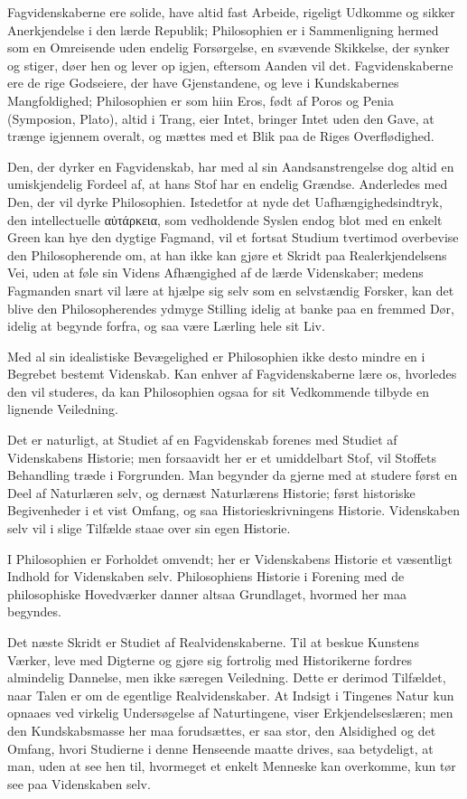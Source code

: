 \documentclass[12pt]{book}
\newcommand{\opage}[1]{\marginnote{\footnotesize\textit{[#1]}}}
\begin{document}
Fagvidenskaberne ere solide, have altid fast Arbeide, rigeligt Udkomme og sikker
Anerkjendelse i den lærde Republik; Philosophien er i Sammenligning hermed som en
Omreisende uden endelig Forsørgelse, en svævende Skikkelse, der synker og stiger, døer hen
og lever op igjen, eftersom Aanden vil det. Fagvidenskaberne ere de rige Godseiere, der
have Gjenstandene, og leve i Kundskabernes Mangfoldighed; Philosophien er som hiin Eros,
født af Poros og Penia (Symposion, Plato), altid i Trang, eier Intet, bringer Intet uden den
\opage{103} Gave, at trænge igjennem overalt, og mættes med et Blik paa de Riges Overflødighed.

Den, der dyrker en Fagvidenskab, har med al sin Aandsanstrengelse dog altid en umiskjendelig
Fordeel af, at hans Stof har en endelig Grændse. Anderledes med Den, der vil dyrke
Philosophien. Istedetfor at nyde det Uafhængighedsindtryk, den intellectuelle αὐτάρκεια,
som vedholdende Syslen endog blot med en enkelt Green kan hye den dygtige Fagmand, vil et
fortsat Studium tvertimod overbevise den Philosopherende om, at han ikke kan gjøre et Skridt
paa Realerkjendelsens Vei, uden at føle sin Videns Afhængighed af de lærde Videnskaber;
medens Fagmanden snart vil lære at hjælpe sig selv som en selvstændig Forsker, kan det blive
den Philosopherendes ydmyge Stilling idelig at banke paa en fremmed Dør, idelig at begynde
forfra, og saa være Lærling hele sit Liv.

Med al sin idealistiske Bevægelighed er Philosophien ikke desto mindre en i Begrebet bestemt
Videnskab. Kan enhver af Fagvidenskaberne lære os, hvorledes den vil studeres, da kan
Philosophien ogsaa for sit Vedkommende tilbyde en lignende Veiledning.

Det er naturligt, at Studiet af en Fagvidenskab forenes med Studiet af Videnskabens
Historie; men forsaavidt her er et umiddelbart Stof, vil Stoffets Behandling træde i
Forgrunden. Man begynder da gjerne med at studere først en Deel af Naturlæren selv, og
dernæst Naturlærens Historie; først historiske Begivenheder i et vist Omfang, og saa
Historieskrivningens Historie. Videnskaben selv vil i slige Tilfælde staae over sin egen
Historie.

I Philosophien er Forholdet omvendt; her er Videnskabens Historie et væsentligt Indhold for
Videnskaben selv. Philosophiens Historie i Forening med de philosophiske Hovedværker danner
altsaa Grundlaget, hvormed her maa begyndes.

Det næste Skridt er Studiet af Realvidenskaberne. Til at beskue Kunstens Værker, leve med
Digterne og gjøre sig
\opage{104} fortrolig med Historikerne fordres almindelig Dannelse, men ikke særegen Veiledning. Dette
er derimod Tilfældet, naar Talen er om de egentlige Realvidenskaber. At Indsigt i Tingenes
Natur kun opnaaes ved virkelig Undersøgelse af Naturtingene, viser Erkjendelseslæren; men
den Kundskabsmasse her maa forudsættes, er saa stor, den Alsidighed og det Omfang, hvori
Studierne i denne Henseende maatte drives, saa betydeligt, at man, uden at see hen til,
hvormeget et enkelt Menneske kan overkomme, kun tør see paa Videnskaben selv.
\end{document}
